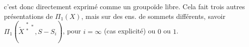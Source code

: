 
c'est donc directement exprimé comme un groupoïde libre. Cela fait trois autres présentations de $\Pi_1(X)$, mais sur des ens. de sommets différents, savoir $\Pi_1(\widetilde{X}^{\substack{*\\*}*},S-S_i)$, pour $i=\infty$ (cas explicité) ou $0$ ou $1$.

